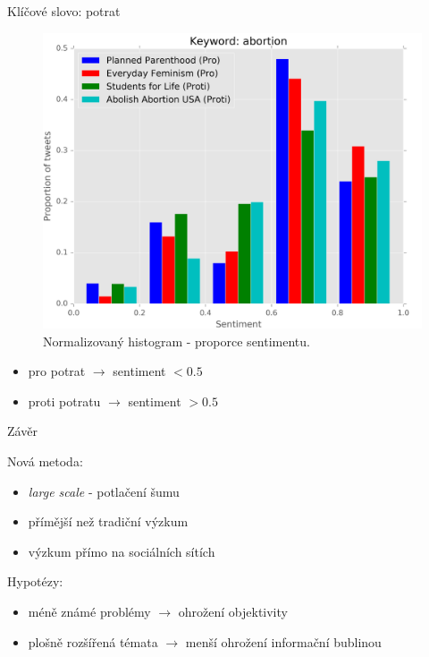 \documentclass[notheorems,12pt]{beamer}
\begin{document}
\begin{frame}{Klíčové slovo: potrat}
    \begin{figure}
        \centering
        \includegraphics[scale=0.37]{./Pics/abortion-normed.png}
        \vspace{-0.2cm}
        \caption*{Normalizovaný histogram - proporce sentimentu.}
    \end{figure}
    \vspace{-0.4cm}
	\begin{itemize}
		\item pro potrat $\rightarrow$ sentiment $< 0.5$
		\item proti potratu $\rightarrow$ sentiment $> 0.5$
	\end{itemize}
\end{frame}
\begin{frame}{Závěr}
    \begin{block}{Nová metoda:}
        \begin{itemize}
            \item \textit{large scale} - potlačení šumu
            \item přímější než tradiční výzkum
            \item výzkum přímo na sociálních sítích
        \end{itemize}
    \end{block}

    \begin{block}{Hypotézy:}
    	\begin{itemize}
            \item méně známé problémy $\rightarrow$ ohrožení objektivity
            \item plošně rozšířená témata $\rightarrow$  menší ohrožení informační bublinou
    	\end{itemize}
    \end{block}
\end{frame}
\end{document}
